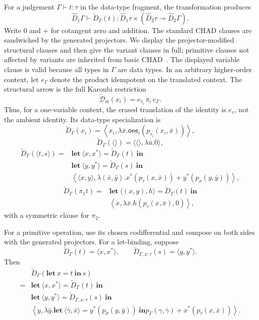 \documentclass[runningheads,envcountsame]{llncs}
\newcommand{\Dst}{\overleftarrow{\mathcal D}_{\mathrm{st}}}
\newcommand{\onehot}{\mathsf{one}}
\begin{document}
For a judgement $\Gamma\vdash t:\tau$ in the data-type fragment, the transformation produces
$$
\widehat D_1\Gamma\vdash
\overleftarrow D_\Gamma(t):
\widehat D_1\tau
\times
(\widehat D_2\tau\multimap\widehat D_2\Gamma).
$$
Write $0$ and $+$ for cotangent zero and addition. The standard CHAD clauses are sandwiched by the generated projectors. We display the projector-modified structural clauses and then give the variant clauses in full; primitive clauses not affected by variants are inherited from basic CHAD~\cite[Section~7]{VakarSmeding2022}. The displayed variable clause is valid because all types in $\Gamma$ are data types. In an arbitrary higher-order context, let $e_\Gamma$ denote the product idempotent on the translated context. The structural arrow is the full Karoubi restriction
$$
\Dst(x_i)=e_{\tau_i}\,\pi_i\,e_\Gamma.
$$
Thus, for a one-variable context, the erased translation of the identity is
$e_\tau$, not the ambient identity. Its data-type specialization is
$$
\overleftarrow D_\Gamma(x_i)
=
\left\langle
x_i,
\lambda\bar x.\onehot_i(p_{\tau_i}(x_i,\bar x))
\right\rangle,
$$
$$
\overleftarrow D_\Gamma(\langle\rangle)
=
\langle\langle\rangle,\lambda\bar u.0\rangle,
$$
$$
\begin{aligned}
\overleftarrow D_\Gamma(\langle t,s\rangle)
={}&
\mathbf{let}\ \langle x,x^*\rangle=\overleftarrow D_\Gamma(t)\ \mathbf{in}\\
&\mathbf{let}\ \langle y,y^*\rangle=\overleftarrow D_\Gamma(s)\ \mathbf{in}\\
&\left\langle
\langle x,y\rangle,
\lambda(\bar x,\bar y).
 x^*(p_\tau(x,\bar x))+y^*(p_\sigma(y,\bar y))
\right\rangle,
\end{aligned}
$$
$$
\begin{aligned}
\overleftarrow D_\Gamma(\pi_1t)
={}&
\mathbf{let}\ \langle(x,y),h\rangle=\overleftarrow D_\Gamma(t)\ \mathbf{in}\\
&\left\langle x,\lambda\bar x.h(p_\tau(x,\bar x),0)\right\rangle,
\end{aligned}
$$
with a symmetric clause for $\pi_2$.

For a primitive operation, use its chosen codifferential and compose on both sides with the generated projectors. For a let-binding, suppose
$$
\overleftarrow D_\Gamma(t)=\langle x,x^*\rangle,
\qquad
\overleftarrow D_{\Gamma,x:\tau}(s)=\langle y,y^*\rangle.
$$
Then
$$
\begin{aligned}
&\overleftarrow D_\Gamma(\mathbf{let}\ x=t\ \mathbf{in}\ s)\\
={}&
\mathbf{let}\ \langle x,x^*\rangle=\overleftarrow D_\Gamma(t)\ \mathbf{in}\\
&\mathbf{let}\ \langle y,y^*\rangle=\overleftarrow D_{\Gamma,x:\tau}(s)\ \mathbf{in}\\
&\left\langle
 y,
 \lambda\bar y.
 \mathbf{let}\ \langle\bar\gamma,\bar x\rangle
 =y^*(p_\sigma(y,\bar y))\ \mathbf{in}
 p_\Gamma(\gamma,\bar\gamma)+x^*(p_\tau(x,\bar x))
\right\rangle.
\end{aligned}
$$
\end{document}
